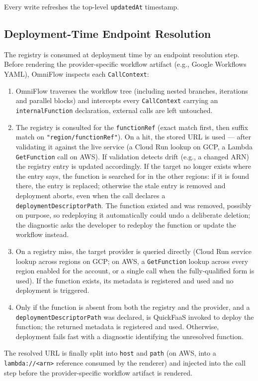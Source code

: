 Every write refreshes the top-level \texttt{updatedAt} timestamp.

\subsection{Deployment-Time Endpoint Resolution}
\label{subsec:endpoint-resolution}
The registry is consumed at deployment time by an endpoint resolution step. Before rendering the provider-specific workflow artifact (e.g., Google Workflows YAML), OmniFlow inspects each \texttt{CallContext}:
\begin{enumerate}
\item OmniFlow traverses the workflow tree (including nested branches, iterations and
parallel blocks) and intercepts every \texttt{CallContext} carrying an
\texttt{internalFunction} declaration, external calls are left untouched.
\item The registry is consulted for the \texttt{functionRef} (exact match first, then
suffix match on \texttt{"region/functionRef"}). On a hit, the stored URL is used ---
after validating it against the live service (a Cloud Run lookup on GCP, a Lambda
\texttt{GetFunction} call on AWS). If validation detects drift (e.g., a changed ARN)
the registry entry is updated accordingly. If the target no longer exists where the entry
says, the function is searched for in the other regions: if it is found there, the entry is
replaced; otherwise the stale entry is removed and deployment aborts, even when the call
declares a \texttt{deploymentDescriptorPath}. The function existed and was removed, possibly
on purpose, so redeploying it automatically could undo a deliberate deletion; the diagnostic
asks the developer to redeploy the function or update the workflow instead.
\item On a registry miss, the target provider is queried
directly (Cloud Run service lookup across regions on GCP; on AWS, a
\texttt{GetFunction} lookup across every region enabled for the account, or a single
call when the fully-qualified form is used). If the function exists, its metadata is
registered and used and no deployment is triggered.
\item Only if the function is absent from both the registry and the provider, and a
\texttt{deploymentDescriptorPath} was declared, is QuickFaaS invoked to deploy the
function; the returned metadata is registered and used. Otherwise, deployment fails
fast with a diagnostic identifying the unresolved function.
\end{enumerate}
The resolved URL is finally split into \texttt{host} and \texttt{path} (on AWS, into a
\texttt{lambda://<arn>} reference consumed by the renderer) and injected into the call step
before the provider-specific workflow artifact is rendered.
